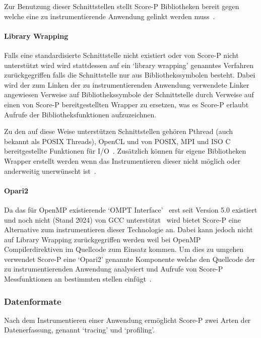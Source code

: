 \documentclass[german,proseminar,hyperref,utf8,lof]{zihpub}
\begin{document}
    Zur Benutzung dieser Schnittstellen stellt Score-P Bibliotheken bereit gegen welche eine
    zu instrumentierende Anwendung gelinkt werden
    muss~.

    \paragraph{Library Wrapping}
    Falls eine standardisierte Schnittstelle nicht existiert oder von Score-P nicht unterstützt wird
    wird stattdessen auf ein `library wrapping' genanntes Verfahren zurückgegriffen falls die Schnittstelle
    nur aus Bibliothekssymbolen besteht.
    Dabei wird der zum Linken der zu instrumentierenden Anwendung verwendete Linker angewiesen Verweise
    auf Bibliothekssymbole der Schnittstelle durch Verweise auf einen von Score-P bereitgestellten
    Wrapper zu ersetzen, was es Score-P erlaubt Aufrufe der Bibliotheksfunktionen aufzuzeichnen.

    Zu den auf diese Weise unterstützen Schnittstellen gehören Pthread (auch bekannt als POSIX Threads),
    OpenCL und von POSIX, MPI und ISO C bereitgestellte Funktionen für
    I/O~.
    Zusätzlich können für eigene Bibliotheken Wrapper erstellt werden wenn das Instrumentieren dieser
    nicht möglich oder anderweitig unerwünscht ist~.

    \paragraph{Opari2}
    Da das für OpenMP existierende `OMPT Interface'~ erst seit Version 5.0
    existiert und noch nicht (Stand 2024) von GCC unterstützt~\cite{gomp} wird bietet Score-P eine
    Alternative zum instrumentieren dieser Technologie an.
    Dabei kann jedoch nicht auf Library Wrapping zurückgegriffen werden weil bei OpenMP
    Compilerdirektiven im Quellcode zum Einsatz kommen.
    Um dies zu umgehen verwendet Score-P eine `Opari2' genannte Komponente welche den Quellcode
    der zu instrumentierenden Anwendung analysiert und Aufrufe von Score-P Messfunktionen an bestimmten
    stellen einfügt~.

    \subsubsection{Datenformate}
    Nach dem Instrumentieren einer Anwendung ermöglicht Score-P zwei Arten der Datenerfassung,
    genannt `tracing' und `profiling'.
\end{document}
